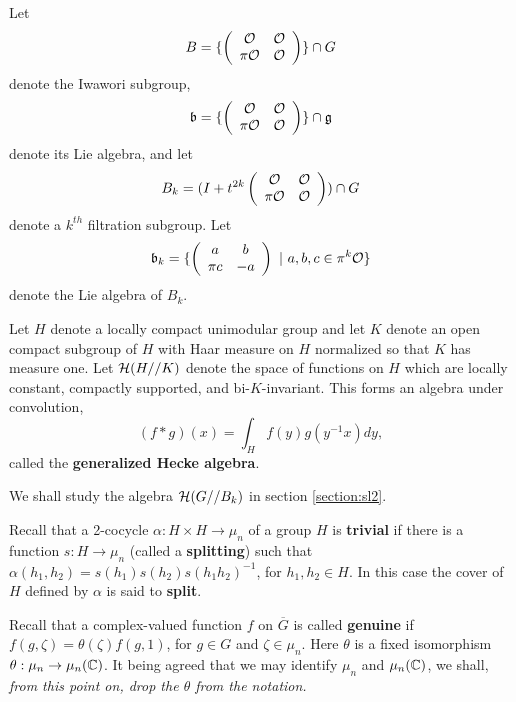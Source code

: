 Let
\[
B=\{
\left(
\begin{array}{cc}
{\cal O} & {\cal O}\\
\pi {\cal O} & {\cal O}
\end{array}
\right)\}\cap G
\]
denote the Iwawori subgroup,
\[
{\frak{b}}=\{
\left(
\begin{array}{cc}
{\cal O} & {\cal O}\\
\pi {\cal O} & {\cal O}
\end{array}
\right)\}\cap \frak{g}
\]
denote its Lie algebra, and let
\[
B_k=(I+t^{2k}\left(
\begin{array}{cc}
{\cal O} & {\cal O}\\
\pi {\cal O} & {\cal O}
\end{array}
\right))\cap G
\]
denote a $k^{th}$ filtration subgroup. Let
\[
{\frak{b}}_k 
=\{
\left(
\begin{array}{cc}
a & b\\
\pi c & -a
\end{array}
\right)
\ |\ 
a,b,c\in \pi^{k}{\cal O}\}
\]
denote the Lie algebra of $B_k$. 

\begin{definition}
Let $H$ denote a locally compact unimodular group and 
let $K$ denote
an open compact subgroup of $H$ with Haar measure on 
$H$ normalized so that
$K$ has measure one. Let
${\cal H}(H//K)$ denote the space of functions 
on $H$ which
are locally constant, compactly supported, and 
bi-$K$-invariant. This forms an
algebra under convolution,
\[
(f*g)(x)=\int_H f(y)g(y^{-1}x)dy,
\]
called the {\bf generalized Hecke algebra}.
\label{def:1}
\end{definition}

We shall study the algebra ${\cal H}(G//B_k)$ in section \ref{section:sl2}.

Recall that a 2-cocycle $\alpha :H\times H \rightarrow \mu_n$
of a group $H$ is {\bf trivial} if there is a function
$s:H\rightarrow \mu_n$ (called a {\bf splitting})
such that $\alpha(h_1,h_2)=s(h_1)s(h_2)s(h_1h_2)^{-1}$,
for $h_1,h_2\in H$. In this case the cover of $H$
defined by $\alpha$ is said to {\bf split}.

Recall that a complex-valued function $f$ on
$\overline{G}$
is called {\bf genuine} if $f(g,\zeta)
=\theta(\zeta) f(g,1)$, for
$g\in G$ and $\zeta\in \mu_n$. Here
$\theta$ is a fixed isomorphism 
$\theta:\mu_n\rightarrow \mu_n({\Bbb{C}})$.
It being agreed that we may identify
$\mu_n$ and $\mu_n({\Bbb{C}})$, we shall, {\it from this point on, 
drop the $\theta$ from the notation.}

